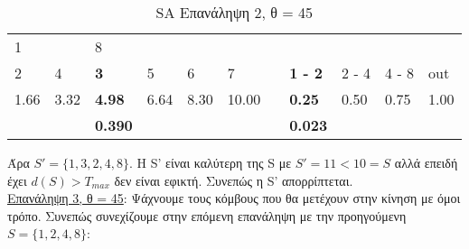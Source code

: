 \documentclass[12pt, a4paper]{article}
\begin{document}
\begin{table}[H]
\centering
\begin{tabular}{lllllllllll}
\multicolumn{1}{|l}{1}     & \multicolumn{1}{l|}{\textbf{}} & 8                                  &                           &                           &       &                                &                                     &                            &                            &      \\
\multicolumn{1}{|l|}{2}    & \multicolumn{1}{l|}{4}         & \multicolumn{1}{l|}{\textbf{3}}    & \multicolumn{1}{l|}{5}    & \multicolumn{1}{l|}{6}    & 7     & \multicolumn{1}{l|}{\textbf{}} & \multicolumn{1}{l|}{\textbf{1 - 2}} & \multicolumn{1}{l|}{2 - 4} & \multicolumn{1}{l|}{4 - 8} & out  \\ \cline{1-6} \cline{8-11} 
\multicolumn{1}{|l|}{1.66} & \multicolumn{1}{l|}{3.32}      & \multicolumn{1}{l|}{\textbf{4.98}} & \multicolumn{1}{l|}{6.64} & \multicolumn{1}{l|}{8.30} & 10.00 & \multicolumn{1}{l|}{\textbf{}} & \multicolumn{1}{l|}{\textbf{0.25}}  & \multicolumn{1}{l|}{0.50}  & \multicolumn{1}{l|}{0.75}  & 1.00 \\
                           &                                & \textbf{0.390}                     &                           &                           &       & \textbf{}                      & \textbf{0.023}                      &                            &                            &     
\end{tabular}
\caption{SA Επανάληψη 2, θ = 45}
\label{my-label}
\end{table}

Άρα \(S'=\{1,3,2,4,8\}\). Η S' είναι καλύτερη της S με \(S'=11<10=S\) αλλά επειδή έχει \(d(S) > T_{max}\) δεν είναι εφικτή.  Συνεπώς η S'  απορρίπτεται. \\


\underline{Επανάληψη 3, θ = 45}: Ψάχνουμε τους κόμβους που θα μετέχουν στην κίνηση με όμοι τρόπο. Συνεπώς συνεχίζουμε στην επόμενη επανάληψη με την προηγούμενη \(S = \{1,2,4,8\}\):
\end{document}
